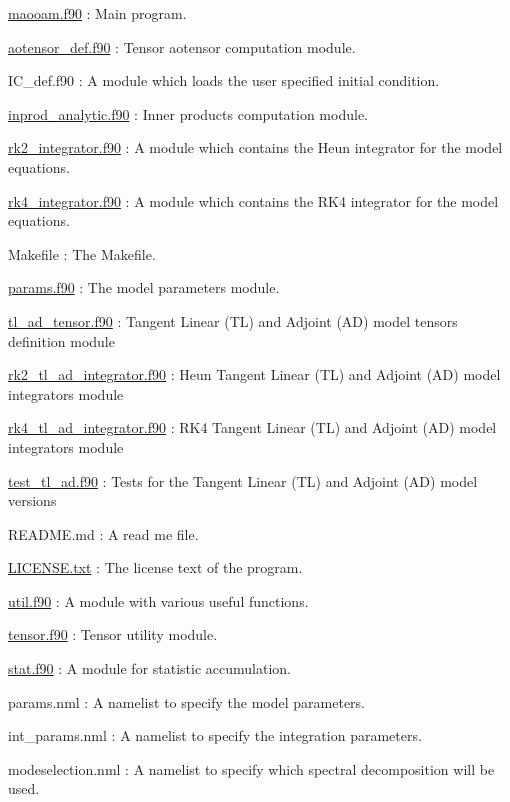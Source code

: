 \begin{DoxyItemize}
\item \hyperlink{maooam_8f90}{maooam.\+f90} \+: Main program.
\item \hyperlink{aotensor__def_8f90}{aotensor\+\_\+def.\+f90} \+: Tensor aotensor computation module.
\item I\+C\+\_\+def.\+f90 \+: A module which loads the user specified initial condition.
\item \hyperlink{inprod__analytic_8f90}{inprod\+\_\+analytic.\+f90} \+: Inner products computation module.
\item \hyperlink{rk2__integrator_8f90}{rk2\+\_\+integrator.\+f90} \+: A module which contains the Heun integrator for the model equations.
\item \hyperlink{rk4__integrator_8f90}{rk4\+\_\+integrator.\+f90} \+: A module which contains the R\+K4 integrator for the model equations.
\item Makefile \+: The Makefile.
\item \hyperlink{params_8f90}{params.\+f90} \+: The model parameters module.
\item \hyperlink{tl__ad__tensor_8f90}{tl\+\_\+ad\+\_\+tensor.\+f90} \+: Tangent Linear (TL) and Adjoint (AD) model tensors definition module
\item \hyperlink{rk2__tl__ad__integrator_8f90}{rk2\+\_\+tl\+\_\+ad\+\_\+integrator.\+f90} \+: Heun Tangent Linear (TL) and Adjoint (AD) model integrators module
\item \hyperlink{rk4__tl__ad__integrator_8f90}{rk4\+\_\+tl\+\_\+ad\+\_\+integrator.\+f90} \+: R\+K4 Tangent Linear (TL) and Adjoint (AD) model integrators module
\item \hyperlink{test__tl__ad_8f90}{test\+\_\+tl\+\_\+ad.\+f90} \+: Tests for the Tangent Linear (TL) and Adjoint (AD) model versions
\item R\+E\+A\+D\+M\+E.\+md \+: A read me file.
\item \hyperlink{LICENSE_8txt}{L\+I\+C\+E\+N\+S\+E.\+txt} \+: The license text of the program.
\item \hyperlink{util_8f90}{util.\+f90} \+: A module with various useful functions.
\item \hyperlink{tensor_8f90}{tensor.\+f90} \+: Tensor utility module.
\item \hyperlink{stat_8f90}{stat.\+f90} \+: A module for statistic accumulation.
\item params.\+nml \+: A namelist to specify the model parameters.
\item int\+\_\+params.\+nml \+: A namelist to specify the integration parameters.
\item modeselection.\+nml \+: A namelist to specify which spectral decomposition will be used.
\end{DoxyItemize}

